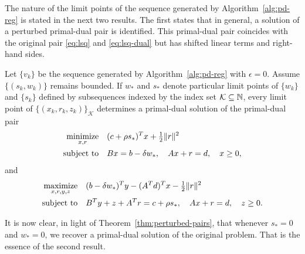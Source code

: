 \documentclass{amsart}
\begin{document}
The nature of the limit points of the sequence generated by
Algorithm~\ref{alg:pd-reg} is stated in the next two results. The first states
that in general, a solution of a perturbed primal-dual pair is identified. This
primal-dual pair coincides with the original pair \eqref{eq:lsq} and
\eqref{eq:lsq-dual} but has shifted linear terms and right-hand sides.

\begin{btheorem}
  \label{thm:perturbed-pairs}
  Let $\{v_k\}$ be the sequence generated by Algorithm~\ref{alg:pd-reg} with
  $\epsilon = 0$. Assume $\{(s_k, w_k)\}$ remains bounded. If $w_*$ and $s_*$
  denote particular limit points of $\{w_k\}$ and $\{s_k\}$ defined by
  subsequences indexed by the index set $\mathcal{K} \subseteq \mathbb{N}$, every limit
  point of $\{(x_k,r_k,z_k)\}_{\mathcal{K}}$ determines a primal-dual solution
  of the primal-dual pair
  \begin{equation}
    \label{eq:lsq-r-perturbed}
    \begin{aligned}
      \displaystyle\mathop{\textup{minimize}}_{x, r} \quad & (c + \rho s_*)^T x + \tfrac{1}{2} \|r\|^2 \\
      \mathop{\textup{subject to}} \quad & Bx = b - \delta w_*, \quad Ax + r = d, \quad x \geq 0,
    \end{aligned}
  \end{equation}
  and
  \begin{equation}
    \label{eq:lsq-r-dual-perturbed}
    \begin{aligned}
      \displaystyle\mathop{\textup{maximize}}_{x, r, y, z} \quad &
        (b - \delta w_*)^T y - (A^T d)^T x - \tfrac{1}{2} \|r\|^2 \\
      \mathop{\textup{subject to}} \quad & B^T y + z + A^T r = c + \rho s_*, \quad
                  Ax + r = d, \quad z \geq 0.
    \end{aligned}
  \end{equation}
\end{btheorem}

It is now clear, in light of Theorem~\ref{thm:perturbed-pairs}, that whenever
$s_* = 0$ and $w_* = 0$, we recover a primal-dual solution of the original
problem. That is the essence of the second result.
\end{document}
